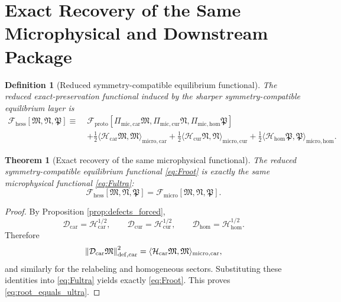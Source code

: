 \documentclass[11pt]{article}
\newcommand{\ProtoFunctional}{\mathscr F_{\mathrm{proto}}}
\newcommand{\UltraFunctional}{\mathscr F_{\mathrm{micro}}}
\newcommand{\RootFunctional}{\mathscr F_{\mathrm{hess}}}
\newcommand{\UltraTensor}{\mathfrak M}
\newcommand{\UltraRelabel}{\mathfrak N}
\newcommand{\UltraFree}{\mathfrak P}
\newcommand{\UltraCarProj}{\Pi_{\mathrm{mic,car}}}
\newcommand{\UltraCurProj}{\Pi_{\mathrm{mic,cur}}}
\newcommand{\UltraHomProj}{\Pi_{\mathrm{mic,hom}}}
\newcommand{\TensorDefect}{\mathcal D_{\mathrm{car}}}
\newcommand{\CurDefect}{\mathcal D_{\mathrm{cur}}}
\newcommand{\HomDefect}{\mathcal D_{\mathrm{hom}}}
\newcommand{\TensorHess}{\mathcal H_{\mathrm{car}}}
\newcommand{\CurHess}{\mathcal H_{\mathrm{cur}}}
\newcommand{\HomHess}{\mathcal H_{\mathrm{hom}}}
\newtheorem{definition}{Definition}
\newtheorem{theorem}{Theorem}
\begin{document}
\section{Exact Recovery of the Same Microphysical and Downstream Package}

\begin{definition}[Reduced symmetry-compatible equilibrium functional]
\label{def:Froot}
The reduced exact-preservation functional induced by the sharper symmetry-compatible equilibrium layer is
\begin{equation}
\begin{aligned}
\RootFunctional[\UltraTensor,\UltraRelabel,\UltraFree]
\equiv\;
&\ProtoFunctional[
\UltraCarProj\UltraTensor,\UltraCurProj\UltraRelabel,\UltraHomProj\UltraFree]
\\
&+\frac12\langle \TensorHess\UltraTensor,\UltraTensor\rangle_{\mathrm{micro,car}}
+\frac12\langle \CurHess\UltraRelabel,\UltraRelabel\rangle_{\mathrm{micro,cur}}
+\frac12\langle \HomHess\UltraFree,\UltraFree\rangle_{\mathrm{micro,hom}}.
\end{aligned}
\label{eq:Froot}
\end{equation}
\end{definition}

\begin{theorem}[Exact recovery of the same microphysical functional]
\label{thm:recover_ultra}
The reduced symmetry-compatible equilibrium functional \eqref{eq:Froot} is exactly the same microphysical functional \eqref{eq:Fultra}:
\begin{equation}
\RootFunctional[\UltraTensor,\UltraRelabel,\UltraFree]
=
\UltraFunctional[\UltraTensor,\UltraRelabel,\UltraFree].
\label{eq:root_equals_ultra}
\end{equation}
\end{theorem}

\begin{proof}
By Proposition \ref{prop:defects_forced},
\[
\TensorDefect=\TensorHess^{1/2},\qquad
\CurDefect=\CurHess^{1/2},\qquad
\HomDefect=\HomHess^{1/2}.
\]
Therefore
\[
\norm{\TensorDefect\UltraTensor}_{\mathrm{def,car}}^2
=
\langle \TensorHess\UltraTensor,\UltraTensor\rangle_{\mathrm{micro,car}},
\]
and similarly for the relabeling and homogeneous sectors. Substituting these identities into \eqref{eq:Fultra} yields exactly \eqref{eq:Froot}. This proves \eqref{eq:root_equals_ultra}.
\end{proof}
\end{document}
